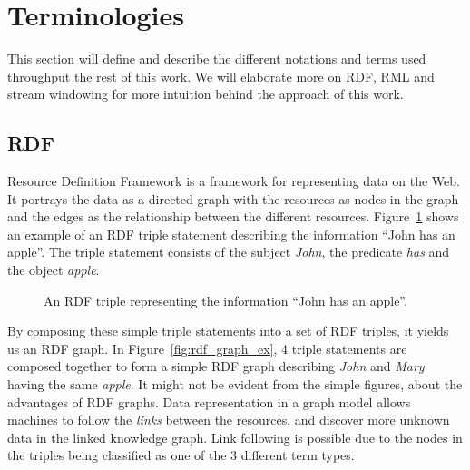 \section{Terminologies}
This section will define and describe the different notations and terms used throughput
the rest of this work. We will elaborate more on RDF, RML and stream windowing for more
intuition behind the approach of this work.

\subsection{RDF}
Resource Definition Framework \cite{rdf_concepts} is a framework for representing data on the Web.
It portrays the data as a directed graph with the resources as nodes in the graph and the
edges as the relationship between the different resources.
Figure~\ref{fig:rdf_triple_ex} shows an example of an RDF triple statement describing
the information “John has an apple”.
The triple statement consists of the subject \textit{John}, the predicate \textit{has}
and the object \textit{apple}.

\begin{figure}[htbp]
    \centering
    \caption{An RDF triple representing the information “John has an apple”.}

    \label{fig:rdf_triple_ex}
\end{figure}


By composing these simple triple statements into a set of RDF triples, it yields us an RDF graph.
In Figure~\ref{fig:rdf_graph_ex}, 4 triple statements are composed together to form a
simple RDF graph describing \textit{John} and \textit{Mary} having the same \textit{apple}.
It might not be evident from the simple figures, about the advantages of
RDF graphs. Data representation in a graph model allows machines to follow the
\textit{links} between the resources, and discover more unknown
data in the linked knowledge graph. Link following is possible due to the nodes in
the triples being classified as one of the 3 different term types.

